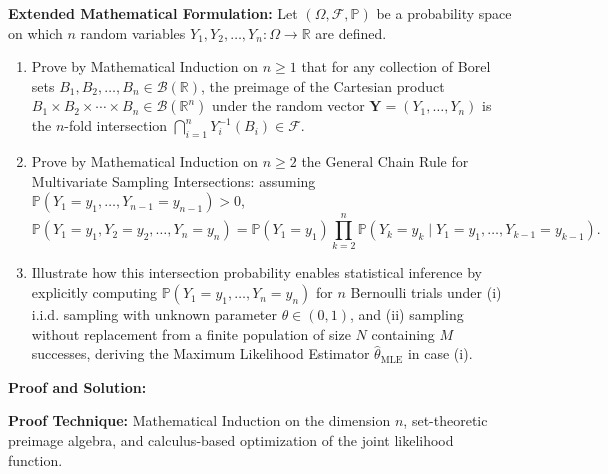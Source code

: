 \documentclass[11pt, letterpaper]{article}
\theoremstyle{definition}
\theoremstyle{remark}
\newcommand{\R}{\mathbb{R}}
\newcommand{\Prob}{\mathbb{P}}
\newcommand{\F}{\mathcal{F}}
\begin{document}
\textbf{Extended Mathematical Formulation:}
Let $(\Omega, \F, \Prob)$ be a probability space on which $n$ random variables $Y_1, Y_2, \dots, Y_n : \Omega \to \R$ are defined.
\begin{enumerate}[label=(\alph*)]
    \item Prove by Mathematical Induction on $n \ge 1$ that for any collection of Borel sets $B_1, B_2, \dots, B_n \in \mathcal{B}(\R)$, the preimage of the Cartesian product $B_1 \times B_2 \times \cdots \times B_n \in \mathcal{B}(\R^n)$ under the random vector $\mathbf{Y} = (Y_1, \dots, Y_n)$ is the $n$-fold intersection $\bigcap_{i=1}^n Y_i^{-1}(B_i) \in \F$.
    \item Prove by Mathematical Induction on $n \ge 2$ the General Chain Rule for Multivariate Sampling Intersections: assuming $\Prob(Y_1 = y_1, \dots, Y_{n-1} = y_{n-1}) > 0$,
    \[
    \Prob(Y_1 = y_1, Y_2 = y_2, \dots, Y_n = y_n) = \Prob(Y_1 = y_1) \prod_{k=2}^{n} \Prob(Y_k = y_k \mid Y_1 = y_1, \dots, Y_{k-1} = y_{k-1}).
    \]
    \item Illustrate how this intersection probability enables statistical inference by explicitly computing $\Prob(Y_1 = y_1, \dots, Y_n = y_n)$ for $n$ Bernoulli trials under (i) i.i.d. sampling with unknown parameter $\theta \in (0, 1)$, and (ii) sampling without replacement from a finite population of size $N$ containing $M$ successes, deriving the Maximum Likelihood Estimator $\hat{\theta}_{\text{MLE}}$ in case (i).
\end{enumerate}

\textbf{Proof and Solution:}

\textbf{Proof Technique:} Mathematical Induction on the dimension $n$, set-theoretic preimage algebra, and calculus-based optimization of the joint likelihood function.
\end{document}
